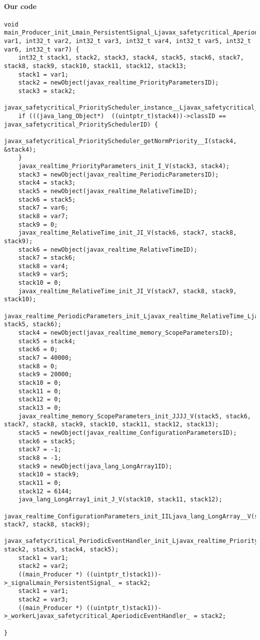 \paragraph{Our code}\hfill
\begin{lstlisting}[firstnumber=281]
void main_Producer_init_Lmain_PersistentSignal_Ljavax_safetycritical_AperiodicEventHandler_JJ_V(int32_t var1, int32_t var2, int32_t var3, int32_t var4, int32_t var5, int32_t var6, int32_t var7) {
	int32_t stack1, stack2, stack3, stack4, stack5, stack6, stack7, stack8, stack9, stack10, stack11, stack12, stack13;
	stack1 = var1;
	stack2 = newObject(javax_realtime_PriorityParametersID);
	stack3 = stack2;
	javax_safetycritical_PriorityScheduler_instance__Ljavax_safetycritical_PriorityScheduler_(&stack4);
	if (((java_lang_Object*)  ((uintptr_t)stack4))->classID == javax_safetycritical_PrioritySchedulerID) {
		javax_safetycritical_PriorityScheduler_getNormPriority__I(stack4, &stack4);
	}
	javax_realtime_PriorityParameters_init_I_V(stack3, stack4);
	stack3 = newObject(javax_realtime_PeriodicParametersID);
	stack4 = stack3;
	stack5 = newObject(javax_realtime_RelativeTimeID);
	stack6 = stack5;
	stack7 = var6;
	stack8 = var7;
	stack9 = 0;
	javax_realtime_RelativeTime_init_JI_V(stack6, stack7, stack8, stack9);
	stack6 = newObject(javax_realtime_RelativeTimeID);
	stack7 = stack6;
	stack8 = var4;
	stack9 = var5;
	stack10 = 0;
	javax_realtime_RelativeTime_init_JI_V(stack7, stack8, stack9, stack10);
	javax_realtime_PeriodicParameters_init_Ljavax_realtime_RelativeTime_Ljavax_realtime_RelativeTime__V(stack4, stack5, stack6);
	stack4 = newObject(javax_realtime_memory_ScopeParametersID);
	stack5 = stack4;
	stack6 = 0;
	stack7 = 40000;
	stack8 = 0;
	stack9 = 20000;
	stack10 = 0;
	stack11 = 0;
	stack12 = 0;
	stack13 = 0;
	javax_realtime_memory_ScopeParameters_init_JJJJ_V(stack5, stack6, stack7, stack8, stack9, stack10, stack11, stack12, stack13);
	stack5 = newObject(javax_realtime_ConfigurationParametersID);
	stack6 = stack5;
	stack7 = -1;
	stack8 = -1;
	stack9 = newObject(java_lang_LongArray1ID);
	stack10 = stack9;
	stack11 = 0;
	stack12 = 6144;
	java_lang_LongArray1_init_J_V(stack10, stack11, stack12);
	javax_realtime_ConfigurationParameters_init_IILjava_lang_LongArray__V(stack6, stack7, stack8, stack9);
	javax_safetycritical_PeriodicEventHandler_init_Ljavax_realtime_PriorityParameters_Ljavax_realtime_PeriodicParameters_Ljavax_realtime_memory_ScopeParameters_Ljavax_realtime_ConfigurationParameters__V(stack1, stack2, stack3, stack4, stack5);
	stack1 = var1;
	stack2 = var2;
	((main_Producer *) ((uintptr_t)stack1))->_signalLmain_PersistentSignal_ = stack2;
	stack1 = var1;
	stack2 = var3;
	((main_Producer *) ((uintptr_t)stack1))->_workerLjavax_safetycritical_AperiodicEventHandler_ = stack2;

}
\end{lstlisting}

